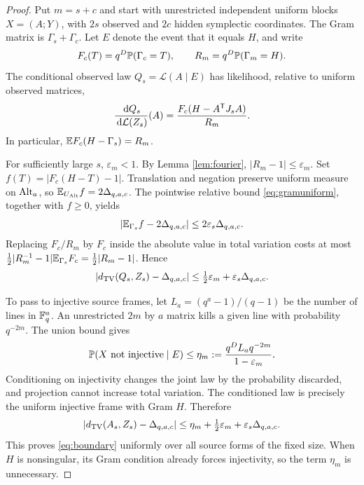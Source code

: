 \begin{proof}
Put $m=s+c$ and start with unrestricted independent uniform blocks
$X=(A;Y)$, with $2s$ observed and $2c$ hidden symplectic coordinates.
The Gram matrix is $\Gamma_s+\Gamma_c$.
Let $E$ denote the event that it equals $H$, and write
\[
 F_c(T)=q^D\mathbb P(\Gamma_c=T),\qquad
 R_m=q^D\mathbb P(\Gamma_m=H).
\]
The conditional observed law $Q_s=\mathcal L(A\mid E)$ has
likelihood, relative to uniform observed matrices,
\begin{equation}\label{eq:conditionaldensity}
 \frac{\,\mathrm d Q_s}{\,\mathrm d\mathcal L(Z_s)}(A)
 =\frac{F_c(H-A^{\mathsf T}J_sA)}{R_m}.
\end{equation}
In particular, $\mathbb E F_c(H-\Gamma_s)=R_m$.

For sufficiently large $s$, $\varepsilon_m<1$.
By Lemma \ref{lem:fourier}, $|R_m-1|\le\varepsilon_m$.
Set $f(T)=|F_c(H-T)-1|$. Translation and negation preserve uniform
measure on $\operatorname{Alt}_a$, so $\mathbb E_{U_{\operatorname{Alt}}}f=2\Delta_{q,a,c}$.
The pointwise relative bound \eqref{eq:gramuniform}, together with
$f\ge0$, yields
\[
 \left|\mathbb E_{\Gamma_s}f-2\Delta_{q,a,c}\right|
 \le2\varepsilon_s\Delta_{q,a,c}.
\]
Replacing $F_c/R_m$ by $F_c$ inside the absolute value in total
variation costs at most
$\tfrac12|R_m^{-1}-1|\mathbb E_{\Gamma_s}F_c
=\tfrac12|R_m-1|$.
Hence
\begin{equation}\label{eq:Qbound}
 \left|d_{\mathrm{TV}}(Q_s,Z_s)-\Delta_{q,a,c}\right|
 \le\tfrac12\varepsilon_m+\varepsilon_s\Delta_{q,a,c}.
\end{equation}

To pass to injective source frames, let
$L_a=(q^a-1)/(q-1)$ be the number of lines in $\mathbb F_q^a$.
An unrestricted $2m$ by $a$ matrix kills a given line with probability
$q^{-2m}$. The union bound gives
\[
 \mathbb P(X\text{ not injective}\mid E)
 \le\eta_m:=\frac{q^DL_aq^{-2m}}{1-\varepsilon_m}.
\]
Conditioning on injectivity changes the joint law by the probability
discarded, and projection cannot increase total variation. The
conditioned law is precisely the uniform injective frame with Gram $H$.
Therefore
\begin{equation}\label{eq:expliciterror}
 \left|d_{\mathrm{TV}}(A_s,Z_s)-\Delta_{q,a,c}\right|
 \le\eta_m+\tfrac12\varepsilon_m+
                   \varepsilon_s\Delta_{q,a,c}.
\end{equation}
This proves \eqref{eq:boundary} uniformly over all source forms of
the fixed size. When $H$ is nonsingular, its Gram condition already
forces injectivity, so the term $\eta_m$ is unnecessary.


\end{proof}
